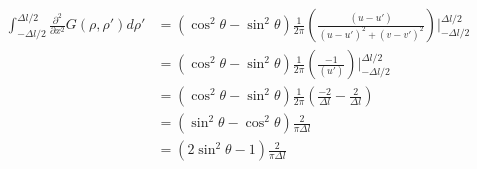 \documentclass{article}
\newcommand{\0}{\varnothing}
\begin{document}


\begin{align*}
    \int_{-\Delta l/2}^{\Delta l/2}\frac{\partial^2}{\partial x^2}G(\rho, \rho')d\rho' &= \left(\cos^2\theta - \sin^2\theta\right)\frac{1}{2\pi}\left(\frac{(u-u')}{(u-u')^2 + (v-v')^2}\right)|_{-\Delta l/2}^{\Delta l/2}\\
    &=\left(\cos^2\theta - \sin^2\theta\right)\frac{1}{2\pi}\left(\frac{-1}{(u')}\right)|_{-\Delta l/2}^{\Delta l/2}\\
    &=\left(\cos^2\theta - \sin^2\theta\right)\frac{1}{2\pi}\left(\frac{-2}{\Delta l} - \frac{2}{\Delta l}\right)\\
    &=\left(\sin^2\theta - \cos^2\theta\right)\frac{2}{\pi\Delta l}\\
    &=\left(2\sin^2\theta - 1\right)\frac{2}{\pi\Delta l}\\
\end{align*}
\end{document}
